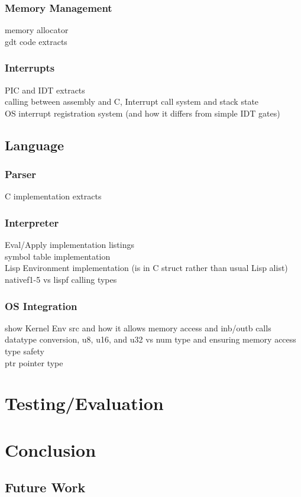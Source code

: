 \documentclass[11pt]{report}
\begin{document}
\subsection{Memory Management}
memory allocator \\
gdt code extracts \\

\subsection{Interrupts}
PIC and IDT extracts \\
calling between assembly and C, Interrupt call system and stack state \\
OS interrupt registration system (and how it differs from simple IDT gates) \\

\section{Language}
\subsection{Parser}
C implementation extracts \\

\subsection{Interpreter}
Eval/Apply implementation listings \\
symbol table implementation \\
Lisp Environment implementation (is in C struct rather than usual Lisp alist) \\
nativef1-5 vs lispf calling types \\

\subsection{OS Integration}
show Kernel Env src and how it allows memory access and inb/outb calls \\
datatype conversion, u8, u16, and u32 vs num type and ensuring memory access type safety \\
ptr pointer type \\


\chapter{Testing/Evaluation}

\chapter{Conclusion}
\section{Future Work}




\end{document}
